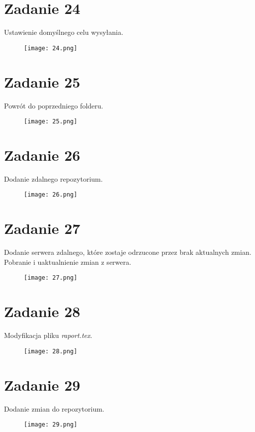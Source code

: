 \documentclass[fleqn,onecolumn,a4paper,12pt,titlepage]{article}
\begin{document}
\section*{Zadanie 24}
Ustawienie domyślnego celu wysyłania.
\begin{figure}[H]%
    \centering\texttt{[image: 24.png]}
\end{figure}

\section*{Zadanie 25}
Powrót do poprzedniego folderu.
\begin{figure}[H]%
    \centering\texttt{[image: 25.png]}
\end{figure}

\section*{Zadanie 26}
Dodanie zdalnego repozytorium.
\begin{figure}[H]%
    \centering\texttt{[image: 26.png]}
\end{figure}

\section*{Zadanie 27}
Dodanie serwera zdalnego, które zostaje odrzucone przez brak aktualnych zmian. Pobranie i uaktualnienie zmian z serwera.
\begin{figure}[H]%
    \centering\texttt{[image: 27.png]}
\end{figure}

\section*{Zadanie 28}
Modyfikacja pliku \textit{raport.tex}.
\begin{figure}[H]%
    \centering\texttt{[image: 28.png]}
\end{figure}

\section*{Zadanie 29}
Dodanie zmian do repozytorium.
\begin{figure}[H]%
    \centering\texttt{[image: 29.png]}
\end{figure}
\end{document}
